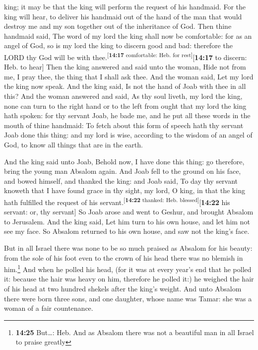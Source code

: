 king; it may be that the king will perform the request of his handmaid.
 For the king will hear, to deliver his handmaid out of
the hand of the man that would destroy me and my son together out of the
inheritance of God.  Then thine handmaid said, The word
of my lord the king shall now be comfortable: for as an angel of God, so
is my lord the king to discern good and bad: therefore the LORD thy God
will be with thee.\textsuperscript{{[}\textbf{14:17} comfortable: Heb.
for rest{]}}{[}\textbf{14:17} to discern: Heb. to hear{]}
 Then the king answered and said unto the woman, Hide not
from me, I pray thee, the thing that I shall ask thee. And the woman
said, Let my lord the king now speak.  And the king said,
Is not the hand of Joab with thee in all this? And the woman answered
and said, As thy soul liveth, my lord the king, none can turn to the
right hand or to the left from ought that my lord the king hath spoken:
for thy servant Joab, he bade me, and he put all these words in the
mouth of thine handmaid:  To fetch about this form of
speech hath thy servant Joab done this thing: and my lord is wise,
according to the wisdom of an angel of God, to know all things that are
in the earth.

 And the king said unto Joab, Behold now, I have done
this thing: go therefore, bring the young man Absalom again.
 And Joab fell to the ground on his face, and bowed
himself, and thanked the king: and Joab said, To day thy servant knoweth
that I have found grace in thy sight, my lord, O king, in that the king
hath fulfilled the request of his
servant.\textsuperscript{{[}\textbf{14:22} thanked: Heb.
blessed{]}}{[}\textbf{14:22} his servant: or, thy servant{]}
 So Joab arose and went to Geshur, and brought Absalom to
Jerusalem.  And the king said, Let him turn to his own
house, and let him not see my face. So Absalom returned to his own
house, and saw not the king's face.

 But in all Israel there was none to be so much praised
as Absalom for his beauty: from the sole of his foot even to the crown
of his head there was no blemish in him.\footnote{\textbf{14:25}
  But\ldots: Heb. And as Absalom there was not a beautiful man in all
  Israel to praise greatly}  And when he polled his head,
(for it was at every year's end that he polled it: because the hair was
heavy on him, therefore he polled it:) he weighed the hair of his head
at two hundred shekels after the king's weight.  And unto
Absalom there were born three sons, and one daughter, whose name was
Tamar: she was a woman of a fair countenance.

